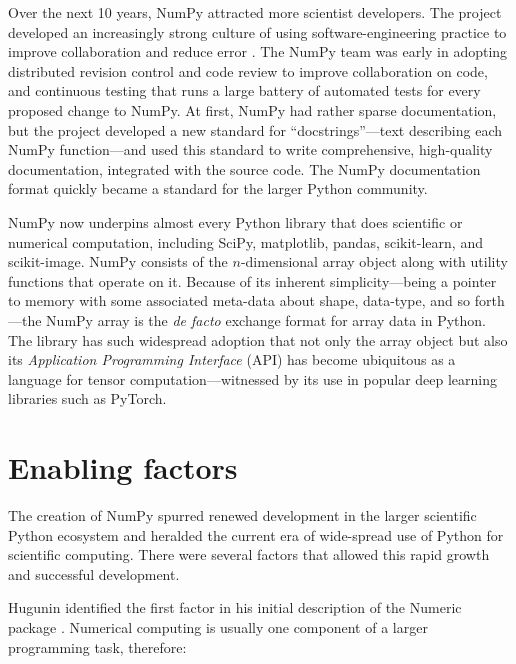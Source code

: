 Over the next 10 years, NumPy attracted more scientist developers.
The project developed an increasingly strong culture of using
software-engineering practice to improve collaboration and reduce error
\cite{millman2014developing}. The NumPy team was early in adopting distributed
revision control and code review to improve collaboration on code, and
continuous testing that runs a large battery of automated tests for every proposed
change to NumPy. At first, NumPy had rather sparse documentation, but the project
developed a new standard for ``docstrings''---text describing each NumPy
function---and used this standard to write comprehensive, high-quality
documentation, integrated with the source code\cite{vanderwalt2008scipy,harrington2008scipy,harrington2009scipy}. The NumPy documentation format
quickly became a standard for the larger Python community.

NumPy now underpins almost every Python library that does scientific or
numerical computation, including SciPy\cite{virtanen2019scipy},
matplotlib\cite{hunter2007matplotlib}, pandas\cite{mckinney-proc-scipy-2010},
scikit-learn\cite{pedregosa2011scikit}, and
scikit-image\cite{vanderwalt2014scikit}.
NumPy consists of the $n$-dimensional array object along with utility functions
that operate on it.
Because of its inherent simplicity---being a pointer to memory with some
associated meta-data about shape, data-type, and so forth---the NumPy array is
the {\it de facto} exchange format for array data in Python.
The library has such widespread adoption that not only the array object but also its
{\it Application Programming Interface} (API) has become ubiquitous as
a language for tensor computation---witnessed by its use in popular
deep learning libraries such as PyTorch\cite{pytorch}.


\section*{Enabling factors}

The creation of NumPy spurred renewed development in the larger scientific
Python ecosystem and heralded the current era of wide-spread use of Python for
scientific computing.
There were several factors that allowed this rapid growth
and successful development.

Hugunin identified the first factor in his initial description of the Numeric
package \cite{Hugunin-whitepaper}.  Numerical computing is usually one
component of a larger programming task, therefore:

